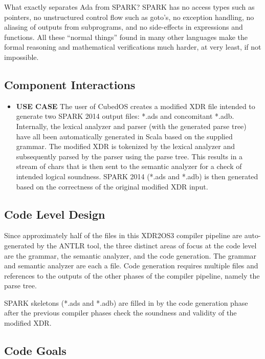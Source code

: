 \begin{itemize}
  What exactly separates Ada from SPARK? SPARK has no access types such as pointers, no
  unstructured control flow such as goto’s, no exception handling, no aliasing of outputs from
  subprograms, and no side-effects in expressions and functions. All these “normal things” found
  in many other languages make the formal reasoning and mathematical verifications much harder,
  at very least, if not impossible.
\end{itemize}

\subsection{Component Interactions}

\begin{itemize}
\item \textbf{USE CASE} The user of CubedOS creates a modified XDR file intended to generate two
  SPARK 2014 output files: *.ads and concomitant *.adb. Internally, the lexical analyzer and
  parser (with the generated parse tree) have all been automatically generated in Scala based on
  the supplied grammar. The modified XDR is tokenized by the lexical analyzer and subsequently
  parsed by the parser using the parse tree. This results in a stream of chars that is then sent
  to the semantic analyzer for a check of intended logical soundness. SPARK 2014 (*.ads and
  *.adb) is then generated based on the correctness of the original modified XDR input.
\end{itemize}

\subsection{Code Level Design}

Since approximately half of the files in this XDR2OS3 compiler pipeline are auto-generated by
the ANTLR tool, the three distinct areas of focus at the code level are the grammar, the
semantic analyzer, and the code generation. The grammar and semantic analyzer are each a file.
Code generation requires multiple files and references to the outputs of the other phases of the
compiler pipeline, namely the parse tree.

SPARK skeletons (*.ads and *.adb) are filled in by the code generation phase after the previous
compiler phases check the soundness and validity of the modified XDR.

\subsection{Code Goals}

